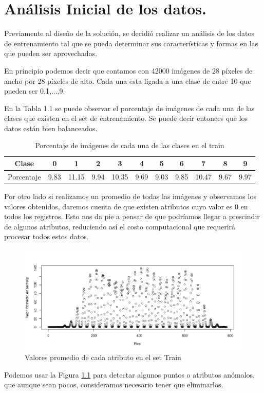 \chapter{Análisis Inicial de los datos.}
Previamente al diseño de la solución, se decidió realizar un análisis de los datos de entrenamiento tal que se pueda determinar sus características y formas en las que pueden ser aprovechadas.

En principio podemos decir que contamos con 42000 imágenes de 28 píxeles de ancho por 28 píxeles de alto. Cada una esta ligada a una clase de entre 10 que pueden ser 0,1,...,9. 

En la Tabla 1.1 se puede observar el porcentaje de imágenes de cada una de las clases que existen en el set de entrenamiento. Se puede decir entonces que los datos están bien balanceados.

\begin{table}[htp]
  \caption{Porcentaje de imágenes de cada una de las clases en el train}
  \label{porc}

  \begin{center}
    \begin{tabular}{|c|c|c|c|c|c|c|c|c|c|c|}
    \hline
      Clase&0&1&2&3&4&5&6&7&8&9 \\
    \hline
      Porcentaje&9.83&11.15&9.94&10.35&9.69&9.03&9.85&10.47&9.67&9.97 \\
    \hline
    \end{tabular}
  \end{center}
\end{table}

Por otro lado si realizamos un promedio de todas las imágenes y observamos los valores obtenidos, daremos cuenta de que existen atributos cuyo valor es 0 en todos los registros. Esto nos da pie a pensar de que podríamos llegar a prescindir de algunos atributos, reduciendo así el costo computacional que requerirá procesar todos estos datos.
\begin{figure}[htp]
  \begin{center}
    \includegraphics[width=15cm]{Rplot.jpeg}
    \caption{Valores promedio de cada atributo en el set Train}
    \label{plot1}
  \end{center}
\end{figure}
Podemos usar la Figura \ref{plot1} para detectar algunos puntos o atributos anómalos, que aunque sean pocos, consideramos necesario tener que eliminarlos.

